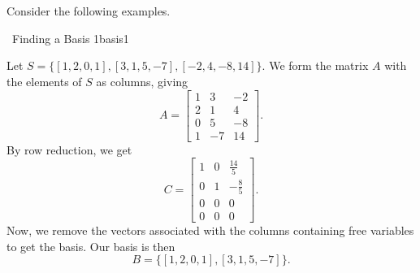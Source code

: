         \pagebreak
        \vphantom
        \\
        \\
        Consider the following examples.
        \begin{example}{\Difficulty\,\Difficulty\,\,Finding a Basis 1}{basis1}

            Let \(S=\{[1,2,0,1],[3,1,5,-7],[-2,4,-8,14]\}\). We form the matrix \(A\) with the elements of \(S\) as columns, giving
            \begin{equation*}
                A=\begin{bmatrix}
                    1 & 3 & -2 \\ 
                    2 & 1 & 4 \\
                    0 & 5 & -8 \\
                    1 & -7 & 14
                \end{bmatrix}.
            \end{equation*}
            By row reduction, we get
            \begin{equation*}
                C=\begin{bmatrix}
                    1 & 0 & \frac{14}{5} \\
                    0 & 1 & -\frac{8}{5} \\
                    0 & 0 & 0 \\
                    0 & 0 & 0 
                \end{bmatrix}.
            \end{equation*} 
            Now, we remove the vectors associated with the columns containing free variables to get the basis. Our basis is then
            \begin{equation*}
                B=\{[1,2,0,1],[3,1,5,-7]\}.
            \end{equation*}
        \end{example}
